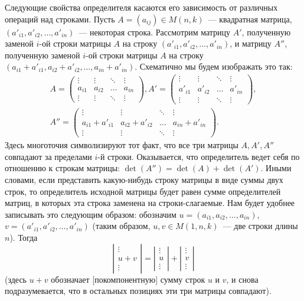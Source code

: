 Следующие свойства определителя касаются его зависимость от различных
операций над строками.
Пусть $A=(a_{ij})\in M(n,k)$~--- квадратная
матрица, $(a'_{i1},a'_{i2},\dots,a'_{in})$~--- некоторая
строка. Рассмотрим матрицу $A'$, полученную заменой $i$-ой строки
матрицы $A$ на строку $(a'_{i1},a'_{i2},\dots,a'_{in})$, и матрицу
$A''$, полученную заменой $i$-ой строки матрицы $A$ на строку
$(a_{i1}+a'_{i1}, a_{i2}+a'_{i2},\dots, a_{in}+a'_{in})$. Схематично
мы будем изображать это так:
$$
\begin{array}{c}
A=\begin{pmatrix}\vdots & \vdots & \ddots & \vdots\\
a_{i1} & a_{i2} & \dots & a_{in}\\
\vdots & \vdots & \ddots & \vdots\end{pmatrix},
A'=\begin{pmatrix}\vdots & \vdots & \ddots & \vdots\\
a'_{i1} & a'_{i2} & \dots & a'_{in}\\
\vdots & \vdots & \ddots & \vdots\end{pmatrix},\\
A''=\begin{pmatrix}\vdots & \vdots & \ddots & \vdots\\
a_{i1}+a'_{i1} & a_{i2}+a'_{i2} & \dots & a_{in}+a'_{in}\\
\vdots & \vdots & \ddots & \vdots\end{pmatrix}.
\end{array}
$$
Здесь многоточия символизируют тот факт, что все три матрицы $A, A',
A''$ совпадают за пределами $i$-й строки.
Оказывается, что определитель ведет себя
 по отношению
к строкам матрицы: $\det(A'')=\det(A)+\det(A')$. Иными словами, если
представить какую-нибудь строку матрицы в виде суммы двух строк, то
определитель исходной матрицы будет равен сумме определителей матриц,
в которых эта строка заменена на строки-слагаемые.
Нам будет удобнее записывать это следующим образом: обозначим
$u=(a_{i1},a_{i2},\dots,a_{in})$,
$v=(a'_{i1},a'_{i2},\dots,a'_{in})$ (таким образом, $u,v\in
M(1,n,k)$~--- две строки длины $n$). Тогда
$$
\left|\begin{matrix}\vdots \\ u+v \\ \vdots\end{matrix}\right|=
\left|\begin{matrix}\vdots \\ u \\ \vdots\end{matrix}\right|+
\left|\begin{matrix}\vdots \\ v \\ \vdots\end{matrix}\right|
$$
 (здесь $u+v$ обозначает [покомпонентную] сумму строк $u$ и $v$, и
снова подразумевается, что в остальных позициях эти три матрицы
совпадают).

